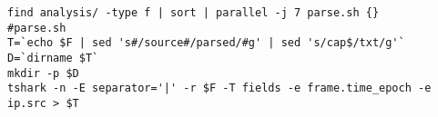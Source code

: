 
\begin{lstlisting}
find analysis/ -type f | sort | parallel -j 7 parse.sh {}
#parse.sh
T=`echo $F | sed 's#/source#/parsed/#g' | sed 's/cap$/txt/g'`
D=`dirname $T`
mkdir -p $D
tshark -n -E separator='|' -r $F -T fields -e frame.time_epoch -e ip.src > $T
\end{lstlisting}
